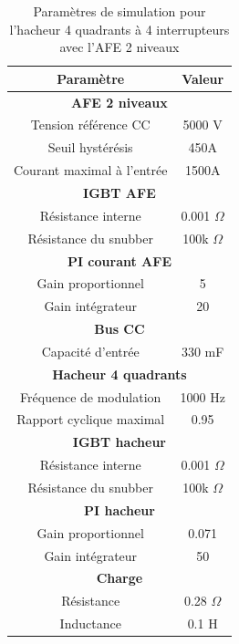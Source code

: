 \documentclass[11pt,letterpaper,final]{report}
\begin{document}
\begin{table}[htb]
\centering
\begin{tabular}{|c|c|} 
  \hline
  \textbf{Paramètre} & \textbf{Valeur}  \\
  \hline\hline \hline
  \multicolumn{2}{|c|}{\textbf{AFE 2 niveaux}}\\ \hline \hline 
  Tension référence CC & 5000 V\\ \hline
  Seuil hystérésis & 450A\\ \hline
  Courant maximal à l'entrée& 1500A \\ \hline \hline
  \multicolumn{2}{|c|}{\textbf{IGBT AFE}}\\ \hline
  Résistance interne & 0.001 $\Omega$\\
  Résistance du snubber & 100k $\Omega$\\ \hline \hline
   \multicolumn{2}{|c|}{\textbf{PI courant AFE}}\\ \hline
  Gain proportionnel & 5 \\
  Gain intégrateur & 20 \\ \hline \hline
  \multicolumn{2}{|c|}{\textbf{Bus CC}}\\ \hline
  Capacité d'entrée & 330 mF\\
  \hline \hline \hline
  
  \multicolumn{2}{|c|}{\textbf{Hacheur 4 quadrants}}\\ \hline \hline
  Fréquence de modulation & 1000 Hz\\ \hline
  Rapport cyclique maximal & 0.95 \\ \hline \hline
  \multicolumn{2}{|c|}{\textbf{IGBT hacheur}}\\ \hline
  Résistance interne & 0.001 $\Omega$\\
  Résistance du snubber & 100k $\Omega$\\ \hline \hline
   \multicolumn{2}{|c|}{\textbf{PI hacheur}}\\ \hline
  Gain proportionnel & 0.071 \\
  Gain intégrateur & 50 \\ \hline \hline
  \multicolumn{2}{|c|}{\textbf{Charge}}\\ \hline
  Résistance & 0.28 $\Omega$\\
  Inductance & 0.1 H\\
  \hline
\end{tabular}
\caption{Paramètres de simulation pour l'hacheur 4 quadrants à 4 interrupteurs avec l'AFE 2 niveaux}
\label{p_AF_hash}
\end{table}
\end{document}

